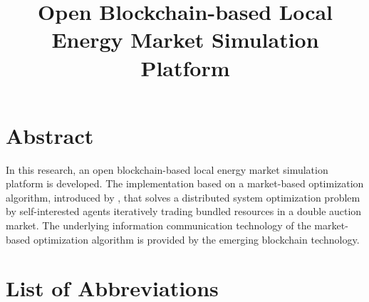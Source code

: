 \documentclass[a4paper, 12pt]{article}
\title{Open Blockchain-based Local Energy Market Simulation Platform}
\begin{document}




\clearpage
\thispagestyle{empty}

\section*{Abstract}

In this research, an open blockchain-based local energy market simulation platform is developed. The implementation
based on a market-based optimization algorithm, introduced by , that solves a 
distributed system optimization problem by self-interested agents iteratively trading bundled resources in a double auction market.
The underlying information communication technology of the market-based optimization algorithm 
is provided by the emerging blockchain technology.


\begin{comment}
[Abstract goes here (max. 1 page)]

* Purpose
* Problem
* Methods
* Results
* Conclusion
        
\end{comment}


\clearpage
{}
\tableofcontents
\clearpage
\listoffigures
\clearpage
\listoftables
\clearpage
\lstlistoflistings
\clearpage

\section*{List of Abbreviations} 
\begin{acronym}[GCRM]
\end{acronym}
\clearpage
\end{document}
